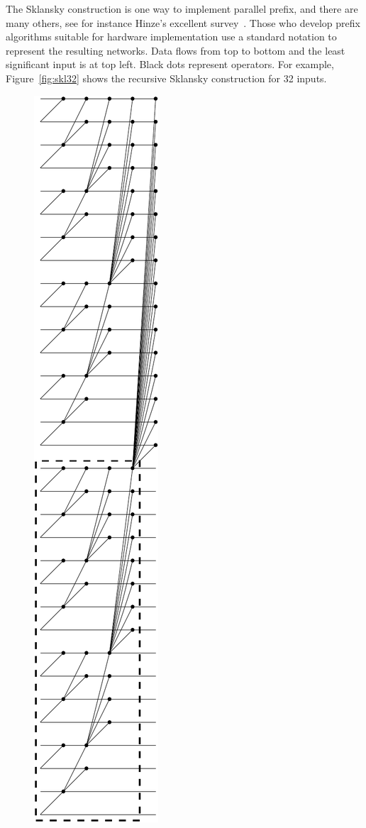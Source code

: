 The Sklansky construction is one way to implement parallel prefix, and there are many others, see for instance Hinze's excellent survey~.
Those who develop prefix algorithms suitable for hardware implementation use a standard notation to represent
the resulting networks. Data flows from top to bottom and
the least significant input is at top left. Black dots represent
operators.
For example, Figure~\ref{fig:skl32} shows the
recursive Sklansky construction for 32 inputs. 
%
\begin{figure}%
\begin{center}
\includegraphics[bb=0 0 123 748, angle=270, scale=0.4]{./ifl/skl32.pdf}

\end{center}
\end{figure}
